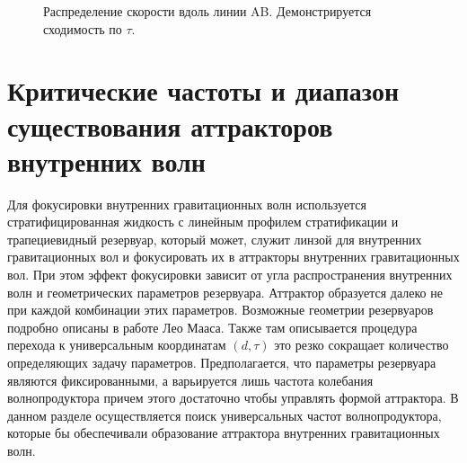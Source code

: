 \begin{figure}
    \centering
    \caption{Распределение скорости вдоль линии AB. Демонстрируется сходимость по $\tau$.}
    \label{fig:tauAttr}
\end{figure}


\section{Критические частоты и диапазон существования аттракторов внутренних волн}

Для фокусировки внутренних гравитационных волн используется стратифицированная жидкость с линейным профилем стратификации и трапециевидный резервуар, который может, служит линзой для внутренних гравитационных вол и фокусировать их в аттракторы внутренних гравитационных вол. При этом эффект фокусировки зависит от угла распространения внутренних волн и геометрических параметров резервуара. Аттрактор образуется далеко не при каждой комбинации этих параметров. Возможные геометрии резервуаров подробно описаны в работе Лео Мааса\cite{Maas1995}. Также там описывается процедура перехода к универсальным координатам $(d,\tau)$ это резко сокращает количество определяющих задачу параметров. Предполагается, что параметры резервуара являются фиксированными, а варьируется лишь частота колебания волнопродуктора причем этого достаточно чтобы управлять формой аттрактора. В данном разделе осуществляется поиск универсальных частот волнопродуктора, которые бы обеспечивали образование аттрактора внутренних гравитационных волн. 

